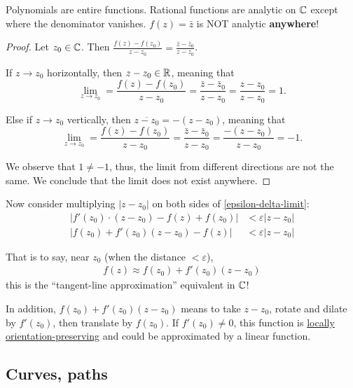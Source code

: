 \documentclass[12pt]{article}
\begin{document}
\eg Polynomials are entire functions.
\eg Rational functions are analytic on $\mathbb{C}$ except where the denominator vanishes.
\noneg $f(z)=\bar z$ is NOT analytic \textbf{anywhere}!
\begin{proof}
    Let $z_0\in \mathbb{C}$. Then $\frac{f(z)-f(z_0)}{z-z_0}=\frac{\bar z-\bar z_0}{z-z_0}$.

    If $z\to z_0$ horizontally, then $z-z_0\in \mathbb{R}$, meaning that $$\lim_{z\to z_0}=\frac{f(z)-f(z_0)}{z-z_0}=\frac{\bar z-\bar z_0}{z-z_0}=\frac{z-z_0}{z-z_0}=1.$$

    Else if $z\to z_0$ vertically, then $\overline{z-z_0}=-(z-z_0)$, meaning that $$\lim_{z\to z_0}=\frac{f(z)-f(z_0)}{z-z_0}=\frac{\bar z-\bar z_0}{z-z_0}=\frac{-(z-z_0)}{z-z_0}=-1.$$

    We observe that $1\neq -1$, thus, the limit from different directions are not the same. We conclude that the limit does not exist anywhere.
\end{proof}


\rmk Now consider multiplying $|z-z_0|$ on both sides of \cref{epsilon-delta-limit}:\begin{align*}
    |f'(z_0)\cdot (z-z_0) - f(z) + f(z_0)| &< \varepsilon |z-z_0|\\
    |f(z_0) + f'(z_0)(z-z_0)-f(z)| &<\varepsilon |z-z_0|
\end{align*}

That is to say, near $z_0$ (when the distance $<\varepsilon$), \begin{align*}
    f(z)≈f(z_0) + f'(z_0)(z-z_0)
\end{align*}
this is the ``tangent-line approximation'' equivalent in $\mathbb{C}$!

In addition, $f(z_0) + f'(z_0)(z-z_0)$ means to take $z-z_0$, rotate and dilate by $f'(z_0)$, then translate by $f(z_0)$. If $f'(z_0)\neq 0$, this function is \uline{locally orientation-preserving} and could be approximated by a linear function.

\subsection{Curves, paths}
\end{document}
